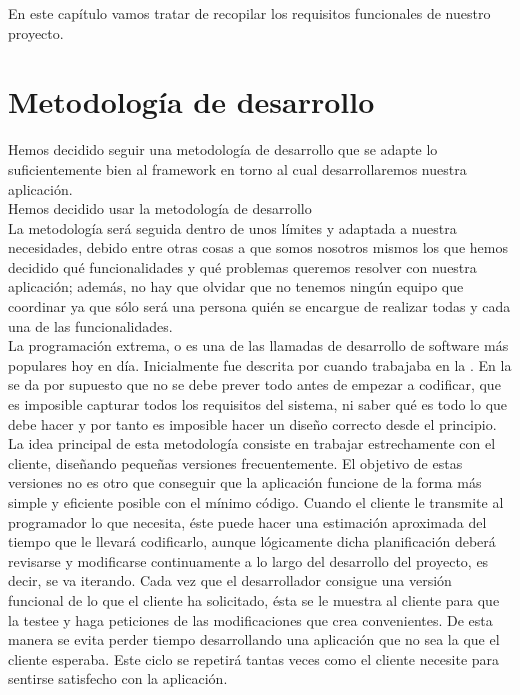 
En este capítulo vamos tratar de recopilar los requisitos funcionales de nuestro
proyecto.

\section{Metodología de desarrollo}
Hemos decidido seguir una metodología de desarrollo que se adapte lo
suficientemente bien al framework en torno al cual desarrollaremos
nuestra aplicación.\\

Hemos decidido usar la metodología de desarrollo \\

La metodología será seguida dentro de unos límites y adaptada a nuestra
necesidades, debido entre otras cosas a que somos nosotros mismos los que hemos
decidido qué funcionalidades y qué problemas queremos resolver con nuestra
aplicación; además, no hay que olvidar que no tenemos ningún equipo que
coordinar ya que sólo será una persona quién se encargue de realizar todas y
cada una de las funcionalidades.\\

La programación extrema, o  es una de las llamadas
 de desarrollo de software más populares hoy en
día. Inicialmente fue descrita por  cuando trabajaba en la
. En la  se da por supuesto que no se
debe prever todo antes de empezar a codificar, que es imposible capturar todos
los requisitos del sistema, ni saber qué es todo lo que debe hacer y por tanto
es imposible hacer un diseño correcto desde el principio.\\

La idea principal de esta metodología consiste en trabajar estrechamente con el
cliente, diseñando pequeñas versiones frecuentemente. El objetivo de estas
versiones no es otro que conseguir que la aplicación funcione de la forma más
simple y eficiente posible con el mínimo código. Cuando el cliente le transmite
al programador lo que necesita, éste puede hacer una estimación aproximada del
tiempo que le llevará codificarlo, aunque lógicamente dicha planificación deberá
revisarse y modificarse continuamente a lo largo del desarrollo del proyecto, es
decir, se va iterando. Cada vez que el desarrollador consigue una versión
funcional de lo que el cliente ha solicitado, ésta se le muestra al cliente para
que la testee y haga peticiones de las modificaciones que crea convenientes. De
esta manera se evita perder tiempo desarrollando una aplicación que no sea la
que el cliente esperaba. Este ciclo se repetirá tantas veces como el cliente
necesite para sentirse satisfecho con la aplicación.\\

